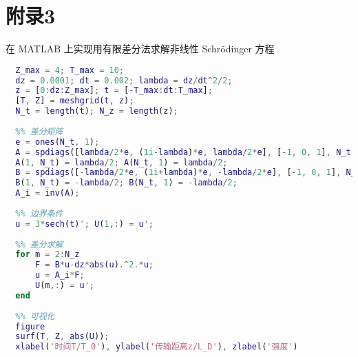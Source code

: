 \newpage
\section{附录3}
在 MATLAB 上实现用有限差分法求解非线性 Schr\"odinger 方程
\begin{lstlisting}[language=Matlab,
  morekeywords={},
  emph={spdiags,inv},
  caption={有限差分法求解三阶孤子}
  ]
  %% 参数设置
  Z_max = 4; T_max = 10;
  dz = 0.0001; dt = 0.002; lambda = dz/dt^2/2;
  z = [0:dz:Z_max]; t = [-T_max:dt:T_max];
  [T, Z] = meshgrid(t, z);
  N_t = length(t); N_z = length(z);
  
  %% 差分矩阵
  e = ones(N_t, 1);
  A = spdiags([lambda/2*e, (1i-lambda)*e, lambda/2*e], [-1, 0, 1], N_t, N_t);
  A(1, N_t) = lambda/2; A(N_t, 1) = lambda/2;
  B = spdiags([-lambda/2*e, (1i+lambda)*e, -lambda/2*e], [-1, 0, 1], N_t, N_t);
  B(1, N_t) = -lambda/2; B(N_t, 1) = -lambda/2;
  A_i = inv(A);
  
  %% 边界条件
  u = 3*sech(t)'; U(1,:) = u';
  
  %% 差分求解
  for m = 2:N_z
      F = B*u-dz*abs(u).^2.*u;
      u = A_i*F;
      U(m,:) = u';
  end
  
  %% 可视化
  figure
  surf(T, Z, abs(U));
  xlabel('时间T/T_0'), ylabel('传输距离z/L_D'), zlabel('强度')
\end{lstlisting}

\newpage
